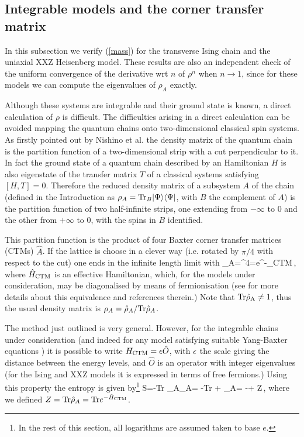 \documentclass[12pt,aps,nofootinbib]{revtex4-1}
\begin{document}
\subsection{Integrable models and the corner transfer matrix}


In this subsection we verify (\ref{mass})
for the transverse Ising chain and the uniaxial
XXZ Heisenberg model.
These results are also an
independent check of the uniform convergence of the derivative wrt $n$
of $\rho^n$ when $n\rightarrow1$, since for these models we can compute
the eigenvalues of $\rho_A$ exactly.

Although these systems are integrable and their ground state is known, a
direct calculation of $\rho$ is difficult. The difficulties arising in a
direct calculation can be avoided
mapping the quantum chains onto two-dimensional classical spin systems.
As firstly pointed out by Nishino et al. \cite{nishino}
the density matrix of the
quantum chain is the partition function of a two-dimensional strip with a cut
perpendicular to it. In fact the ground state of a quantum chain described
by an Hamiltonian $H$ is also eigenstate of the transfer matrix $T$ of a
classical systems satisfying $[H,T]=0$.
Therefore the reduced density matrix of a subsystem $A$ of the chain (defined
in the Introduction as
$\rho_A={\rm Tr}_B |\Psi\rangle\langle \Psi|$, with
$B$ the complement of $A$) is the
partition function of two half-infinite strips, one extending from $-\infty$
to $0$ and the other from $+\infty$ to 0, with the spins in $B$
identified.

This partition
function is the product of four Baxter corner transfer matrices
(CTMs) \cite{Baxter}
$\hat A$.
If the lattice is choose in a clever way (i.e. rotated by $\pi/4$ with
respect to the cut)
one ends in the infinite length limit with \cite{pkl-99}
\be
\hat{\rho}_A=^4=e^{-_{\rm CTM}}\,,
\ee
where $\hat{H}_{\rm CTM}$ is an effective Hamiltonian, which, for the
models under consideration, may be diagonalised by means
of fermionisation (see for more details about this equivalence
\cite{pkl-99} and references therein.)
Note that ${\rm Tr \hat{\rho}_A \neq 1}$, thus the usual density matrix is
$\rho_A=\hat{\rho}_A/{\rm Tr}\hat{\rho}_A$.

The method just outlined is very general. However, for the
integrable chains under consideration (and indeed for any model
satisfying suitable Yang-Baxter equations \cite{Baxter}) it is
possible to  write $H_{\rm CTM}=\epsilon \hat{O}$, with $\epsilon$ the scale giving the
distance between the energy levels, and $\hat{O}$ is an
operator with integer eigenvalues (for the Ising and XXZ models it is
expressed in terms of free fermions.)
Using this property the entropy is given by\footnote{In the rest of
this section, all logarithms are assumed taken to base $e$.}
\be
S=-{\rm Tr} \rho_A\log\rho_A=
-{\rm Tr} +
\hat{\rho}_A=
-\e{}+ \log Z\,,
\label{entrint}
\ee
where we defined $Z={\rm Tr} \hat{\rho}_A={\rm Tr} e^{-\hat{H}_{\rm CTM}}$.
\end{document}
